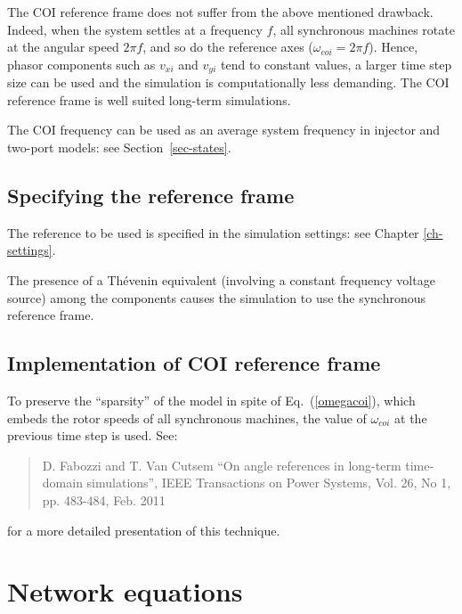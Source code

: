 The COI reference frame does not suffer from the above mentioned drawback. Indeed, when the system settles at a frequency $f$, all synchronous machines rotate at the angular speed $2 \pi f$, and so do the reference axes ($\omega_{coi} = 2 \pi f$). Hence, phasor components such as $v_{xi}$ and $v_{yi}$ tend to constant values, a larger time step size can be used and the simulation is computationally less demanding. The COI reference frame is well suited long-term simulations.

The COI frequency can be used as an average system frequency in injector and two-port models: see Section~\ref{sec-states}.


\subsection{Specifying the reference frame}

The reference to be used is specified in the simulation settings: see Chapter \ref{ch-settings}. 

The presence of a Th\'evenin equivalent (involving a constant frequency voltage source) among the components causes the simulation to use the synchronous reference frame.

\subsection{Implementation of COI reference frame}

To preserve the ``sparsity'' of the model in spite of Eq.~(\ref{omegacoi}), which embeds the rotor speeds of all synchronous machines, the value of $\omega_{coi}$ at the previous time step is used. See:
\begin{quote}
\rm D. Fabozzi and T. Van Cutsem ``On angle references in long-term time-domain simulations'', IEEE Transactions on Power Systems, Vol. 26, No 1, pp. 483-484, Feb. 2011
\end{quote}

for a more detailed presentation of this technique.


\section{Network equations}

